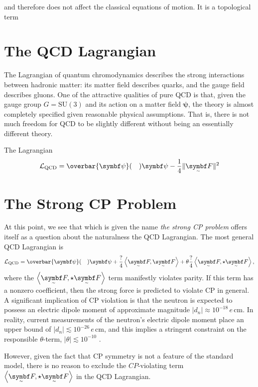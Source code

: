 and therefore does not affect the classical equations of motion.
It is a topological term




\section{The QCD Lagrangian}

The Lagrangian of quantum chromodynamics describes the strong interactions between hadronic matter: its matter field describes quarks, and the gauge field describes gluons.
One of the attractive qualities of pure QCD is that, given the gauge group $G = \mathrm{SU}(3)$ and its action on a matter field $\bm\psi$, the theory is almost completely specified given reasonable physical assumptions.
That is, there is not much freedom for QCD to be slightly different without being an essentially different theory.

The Lagrangian
\begin{align}
	\cal L_\text{QCD} = \overbar{\bm\psi}\qty(\quad)\bm\psi - \frac14\|\tsbm F\|^2
\end{align}



\section{The Strong CP Problem}

At this point, we see that which is given the name \emph{the strong CP problem} offers itself as a question about the naturalness the QCD Lagrangian.
The most general QCD Lagrangian is
\begin{align}
	\cal L_\text{QCD} = \overbar{\bm\psi}\qty(\quad)\bm\psi
	+ \frac?4\ang{\tsbm F, \tsbm F}
	+ \theta \frac?4\ang{\tsbm F, \star \tsbm F}
,\end{align}
where the $\ang{\tsbm F, \star\tsbm F}$ term manifestly violates parity.
If this term has a nonzero coefficient, then the strong force is predicted to violate CP in general.
A significant implication of CP violation is that the neutron is expected to possess an electric dipole moment of approximate magnitude $|d_n| \approx 10^{-18} \,e\,\mathrm{cm}$.
In reality, current measurements \cite{electric_dipole_neutron_2020} of the neutron's electric dipole moment place an upper bound of $|d_n| \lesssim 10^{-26} \,e\,\mathrm{cm}$, and this implies a stringent constraint on the responsible $\theta$-term, $|\theta| \lesssim 10^{-10}$ \cite{Review_2018}.

However, given the fact that CP symmetry is not a feature of the standard model, there is no reason to exclude the $CP$-violating term $\ang{\tsbm F, \star\tsbm F}$ in the QCD Lagrangian.
